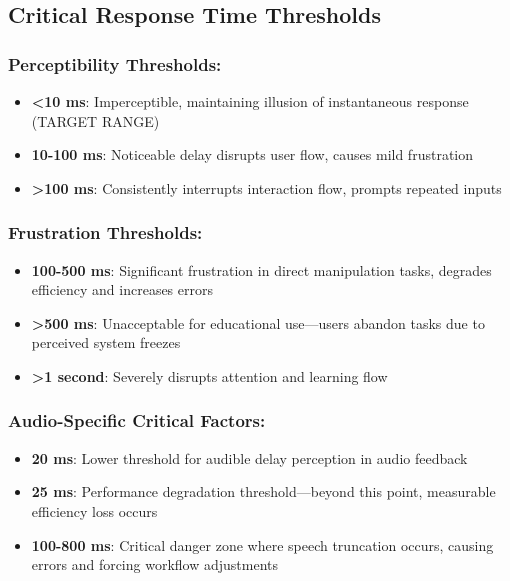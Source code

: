 \subsection{Critical Response Time Thresholds}\label{critical-response-time-thresholds}

\subsubsection{Perceptibility Thresholds:}

\begin{itemize}
	\item \textbf{<10 ms}: Imperceptible, maintaining illusion of instantaneous response (TARGET RANGE) \supercite{Nielsen1993UsabilityEngineering}
	\item \textbf{10-100 ms}: Noticeable delay disrupts user flow, causes mild frustration \supercite{Miller1968ReactionTime}
	\item \textbf{>100 ms}: Consistently interrupts interaction flow, prompts repeated inputs \supercite{Shneiderman1998DesigningTheUserInterface}
\end{itemize}


\subsubsection{Frustration Thresholds:}

\begin{itemize}
	\item \textbf{100-500 ms}: Significant frustration in direct manipulation tasks, degrades efficiency and increases errors \supercite{Card1983ThePsychologyOfHumanComputerInteraction}
	\item \textbf{>500 ms}: Unacceptable for educational use—users abandon tasks due to perceived system freezes \supercite{Sears1993TheEffectOfResponseTime}
	\item \textbf{>1 second}: Severely disrupts attention and learning flow \supercite{Dix2004HumanComputerInteraction}
\end{itemize}


\subsubsection{Audio-Specific Critical Factors:}

\begin{itemize}
	\item \textbf{20 ms}: Lower threshold for audible delay perception in  audio feedback \supercite{Grunwald1999AuditoryLatency}
	\item \textbf{25 ms}: Performance degradation threshold—beyond this point, measurable efficiency loss occurs \supercite{Fowler2011ScreenReaderLatency}
	\item \textbf{100-800 ms}: Critical danger zone where speech truncation occurs, causing  errors and forcing workflow adjustments \supercite{Bigham2014UnderstandingScreenReaderUsage}
\end{itemize}


